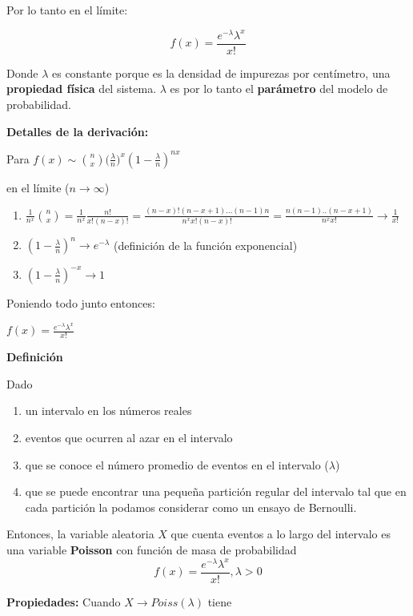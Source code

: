 \documentclass[
]{book}
\providecommand{\tightlist}{%
  \setlength{\itemsep}{0pt}\setlength{\parskip}{0pt}}
\begin{document}
Por lo tanto en el límite:

\[f(x)= \frac{e^{-\lambda}\lambda^x}{x!}\]

Donde \(\lambda\) es constante porque es la densidad de impurezas por centímetro, una \textbf{propiedad física} del sistema. \(\lambda\) es por lo tanto el \textbf{parámetro} del modelo de probabilidad.

\textbf{Detalles de la derivación:}

Para \(f(x) \sim \binom nx \big(\frac{\lambda}{n}\big)^x(1-\frac{\lambda}{n})^{nx}\)

en el límite (\(n \rightarrow \infty\))

\begin{enumerate}
\def\labelenumi{\arabic{enumi})}
\tightlist
\item
  \(\frac{1}{n^x}\binom n x =\frac{1}{n^x}\frac{n!}{x! (n-x)!}=\frac{(n-x)!(n-x+1)...(n-1)n}{n^x x! (n-x)!}=\frac{n(n-1)..(n-x+1)}{n^x x!} \rightarrow \frac{1}{x!}\)
\item
  \((1-\frac{\lambda}{n})^{n} \rightarrow e^{-\lambda}\) (definición de la función exponencial)
\item
  \((1-\frac{\lambda}{n})^{-x} \rightarrow 1\)
\end{enumerate}

Poniendo todo junto entonces:

\(f(x)= \frac{e^{-\lambda}\lambda^x}{x!}\)

\textbf{Definición}

Dado

\begin{enumerate}
\def\labelenumi{\arabic{enumi})}
\tightlist
\item
  un intervalo en los números reales
\item
  eventos que ocurren al azar en el intervalo
\item
  que se conoce el número promedio de eventos en el intervalo (\(\lambda\))
\item
  que se puede encontrar una pequeña partición regular del intervalo tal que en cada partición la podamos considerar como un ensayo de Bernoulli.
\end{enumerate}

Entonces, la variable aleatoria \(X\) que cuenta eventos a lo largo del intervalo es una variable \textbf{Poisson} con función de masa de probabilidad
\[f(x)= \frac{e^{-\lambda}\lambda^x}{x!}, \lambda>0\]

\textbf{Propiedades:}
Cuando \(X \rightarrow Poiss(\lambda)\) tiene
\end{document}
